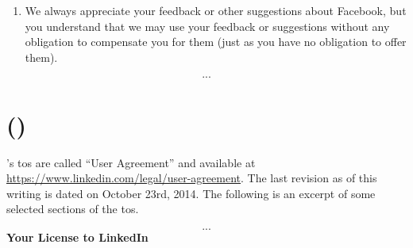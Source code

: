 \begin{appendices}
\begin{quote_tos}
\begin{enumerate}
            \item We always appreciate your feedback or other suggestions about Facebook, 
            but you understand that we may use your feedback or suggestions without any 
            obligation to compensate you for them (just as you have no obligation to offer 
            them).
        \end{enumerate}
        \[...\]
    \end{quote_tos}

    \section[\LinkedIn]{\LinkedIn (\LinkedInCorp)}
        \label{section:thesis:excerpts-linkedin}
    \LinkedIn's \acs{tos} are called ``User Agreement'' and available at \url{https://www.linkedin.com/legal/user-agreement}. 
    The last revision as of this writing is dated on October 23rd, 2014. The following 
    is an excerpt of some selected sections of the \ac{tos}.

    \begin{quote_tos}
        \[...\]
        \textbf{Your License to LinkedIn}
        

\end{quote_tos}
\end{appendices}
